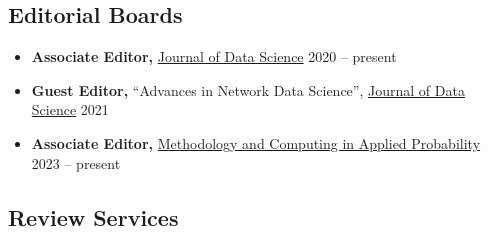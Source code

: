 \documentclass[12pt,letterpaper]{article}
\newenvironment{cventry}{\begin{minipage}[t]{\linewidth}}{\end{minipage}}
\begin{document}
	\subsection*{Editorial Boards}
	\begin{itemize}
		\item\begin{cventry} \textbf{Associate Editor,} 
		\href{https://jds-online.org/journal/JDS}{Journal of Data Science} \hfill 2020 -- present
		\par\end{cventry}
		\item\begin{cventry} \textbf{Guest Editor,} ``Advances in Network Data 
		Science'', \href{https://jds-online.org/journal/JDS}{Journal 
		of Data Science} \hfill 2021
		\par\end{cventry}
		\item\begin{cventry} \textbf{Associate Editor,}
		\href{https://www.springer.com/journal/11009/}{Methodology 
		and Computing in Applied Probability} \hfill 2023 -- present
		\par\end{cventry}
	\end{itemize}

	\subsection*{Review Services}
\end{document}
